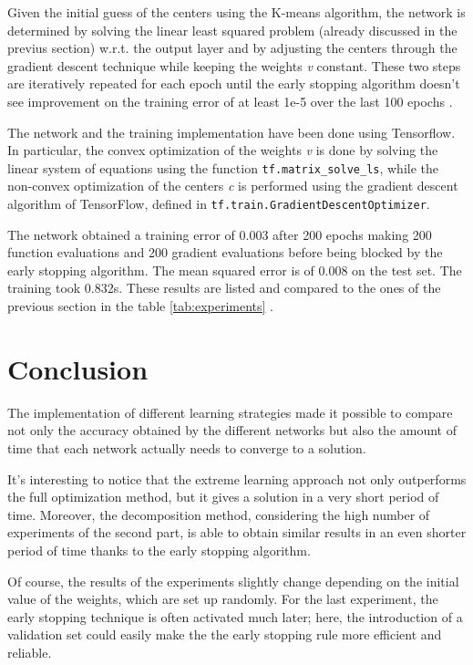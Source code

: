 \documentclass[a4paper]{article}
\numberwithin{equation}{section} %
\numberwithin{figure}{section} %
\numberwithin{table}{section} %
\theoremstyle{definition}
\begin{document}
Given the initial guess of the centers using the K-means algorithm,
the network is determined by solving the linear least squared problem
(already discussed in the previus section) w.r.t. the output layer and by
adjusting the centers through the gradient descent technique while keeping the
weights \textit{v} constant.
These two steps are iteratively repeated for each epoch until the early
stopping algorithm doesn't see improvement on the training error of at least
1e-5 over the last 100 epochs .

The network and the training implementation have been done using Tensorflow.
In particular, the convex optimization of the weights
\textit{v} is done by solving the linear system of equations using the function
\texttt{tf.matrix\_solve\_ls}, while the non-convex optimization of the centers
\textit{c} is performed using the gradient descent algorithm of TensorFlow,
defined in \texttt{tf.train.GradientDescentOptimizer}.

The network obtained a training error of 0.003 after 200 epochs making
200 function evaluations and 200 gradient evaluations before being
blocked by the early stopping algorithm.
The mean squared error is of 0.008 on the test set. The training took 0.832s.
These results are listed and compared to the ones of the previous section in the table \ref{tab:experiments} .


\section{Conclusion}

The implementation of different learning strategies made it possible to
compare not only the accuracy obtained by the different networks but also the
amount of time that each network actually needs to converge to a solution.

It's interesting to notice that the extreme learning approach not only
outperforms the full optimization method, but it gives a solution
in a very short period of time. Moreover, the decomposition method, considering
the high number of experiments of the second part, is able to obtain similar
results in an even shorter period of time thanks to the early stopping algorithm.

Of course, the results of the experiments slightly change depending on the
initial value of the weights, which are set up randomly.
For the last experiment, the early stopping
technique is often activated much later; here, the introduction of a validation set
could easily make the the early stopping rule more efficient and reliable.
\end{document}
